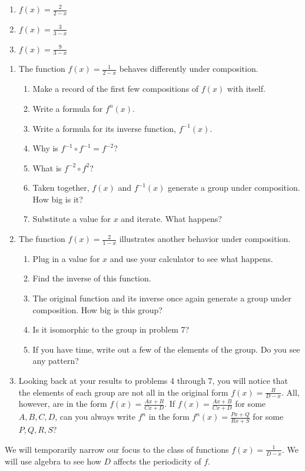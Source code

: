 \documentclass[../gatm.tex]{subfiles}
\begin{document}
\begin{multicols}{3}
\begin{enumerate}
\item \label{prob:compose_start}$f(x)=\frac{2}{2-x}$
\item $f(x)=\frac{3}{3-x}$
\item \label{prob:compose_end}$f(x)=\frac{9}{3-x}$
\end{enumerate}
\end{multicols}
\begin{enumerate}
\item The function $f(x)=\frac{1}{2-x}$ behaves differently under composition.
\begin{enumerate}
\item Make a record of the first few compositions of $f(x)$ with itself.
\item Write a formula for $f^n(x)$.
\item Write a formula for its inverse function, $f^{-1}(x)$.
\item Why is $f^{-1}\circ f^{-1}=f^{-2}$?
\item What is $f^{-2}\circ f^2$?
\item Taken together, $f(x)$ and $f^{-1}(x)$ generate a group under composition. How big is it?
\item Substitute a value for $x$ and iterate. What happens?
\end{enumerate}
\item The function $f(x)=\frac{2}{1-x}$ illustrates another behavior under composition.
\begin{enumerate}
\item Plug in a value for $x$ and use your calculator to see what happens.
\item Find the inverse of this function.
\item The original function and its inverse once again generate a group under composition. How big is this group?
\item Is it isomorphic to the group in problem 7?
\item If you have time, write out a few of the elements of the group. Do you see any pattern?
\end{enumerate}
\item Looking back at your results to problems 4 through 7, you will notice that the elements of each group are not all in the original form $f(x)=\frac{B}{D-x}$. All, however, are in the form $f(x)=\frac{Ax+B}{Cx+D}$. If $f(x)=\frac{Ax+B}{Cx+D}$ for some $A,B,C,D$, can you always write $f^n$ in the form $f^n(x)=\frac{Px+Q}{Rx+S}$ for some $P,Q,R,S$?
\end{enumerate}
We will temporarily narrow our focus to the class of functions $f(x)=\frac{1}{D-x}$. We will use algebra to see how $D$ affects the periodicity of $f$.
\end{document}
